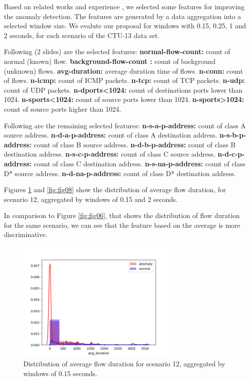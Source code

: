 \documentclass[review]{elsarticle}
\begin{document}
Based on related works \cite{lakhina2005mining, callegari2011novel, chandrashekar2014survey, acarali2016survey} and experience \cite{vieira2017model, galibus2017offline}, we selected some features for improving the anomaly detection.
The features are generated by a data aggregation into a selected window size. We evalute our proposal for windows with 0.15, 0.25, 1 and 2 seconds, for each scenario of the CTU-13 data set.
	
Following (2 slides) are the selected features:
\textbf{normal-flow-count:} count of normal (known) flow.
\textbf{background-flow-count :} count of background (unknown) flows.
\textbf{avg-duration:} average duration time of flows.
\textbf{n-conn:} count of flows.
\textbf{n-icmp:} count of ICMP packets.
\textbf{n-tcp:} count of TCP packets.
\textbf{n-udp:} count of UDP packets.
\textbf{n-dports<1024:} count of destinations ports lower than 1024.
\textbf{n-sports<1024:} count of source ports lower than 1024.
\textbf{n-sports>1024:} count of source ports higher than 1024.

Following are the remaining selected features:
\textbf{n-s-a-p-address:} count of class A source address.
\textbf{n-d-a-p-address:} count of class A destination address.
\textbf{n-s-b-p-address:} count of class B source address.
\textbf{n-d-b-p-address:} count of class B destination address.
\textbf{n-s-c-p-address:} count of class C source address.
\textbf{n-d-c-p-address:} count of class C destination address.
\textbf{n-s-na-p-address:} count of class D* source address.
\textbf{n-d-na-p-address:} count of class D* destination address.

Figures \ref{fig:fig07} and \ref{fig:fig08} show the distribution of average flow duration, for scenario 12, aggregated by windows of 0.15 and 2 seconds.

In comparison to Figure \ref{fig:fig06}, that shows the distribution of flow duration for the same scenario, we can see that the feature based on the average is more discriminative.

\begin{figure}[h!]
     \centering
     \includegraphics[width=8cm]{figures/agg_distplot_0_15s_12_avg_duration.png}
     \caption{Distribution of average flow duration for scenario 12, aggregated by windows of 0.15 seconds.}
     \label{fig:fig07}
\end{figure}
\end{document}
